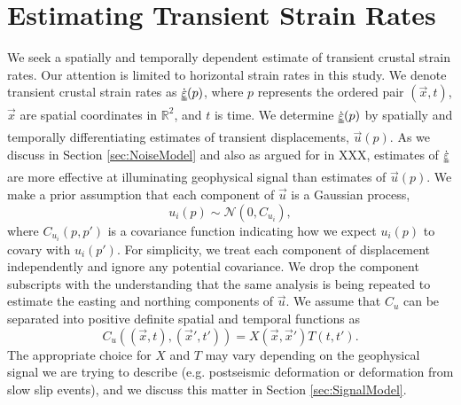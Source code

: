 \documentclass[10pt,letter]{article}
\newcommand*{\du}[1]{\uuline{#1}}
\begin{document}
\section{Estimating Transient Strain Rates}\label{sec:Method}
We seek a spatially and temporally dependent estimate of transient crustal strain rates. Our attention is limited to horizontal strain rates in this study. We denote transient crustal strain rates as $\dot{\du{\varepsilon}}(p)$, where $p$ represents the ordered pair $(\vec{x},t)$, $\vec{x}$ are spatial coordinates in $\mathbb{R}^2$, and $t$ is time. We determine $\dot{\du{\varepsilon}}(p)$ by spatially and temporally differentiating estimates of transient displacements, $\vec{u}(p)$.  As we discuss in Section \ref{sec:NoiseModel} and also as argued for in XXX, estimates of $\dot{\du{\varepsilon}}$ are more effective at illuminating geophysical signal than estimates of $\vec{u}(p)$. We make a prior assumption that each component of $\vec{u}$ is a Gaussian process,
\begin{equation}\label{eq:TransientDeformation}
u_i(p) \sim \mathcal{N}\left(0,C_{u_i}\right),
\end{equation}
where $C_{u_i}(p,p')$ is a covariance function indicating how we expect $u_i(p)$ to covary with $u_i(p')$. For simplicity, we treat each component of displacement independently and ignore any potential covariance. We drop the component subscripts with the understanding that the same analysis is being repeated to estimate the easting and northing components of $\vec{u}$. We assume that $C_u$ can be separated into positive definite spatial and temporal functions as 
\begin{equation}\label{eq:TransientCovariance}
C_{u}\left((\vec{x},t),(\vec{x}',t')\right) = X(\vec{x},\vec{x}')T(t,t').
\end{equation}  
The appropriate choice for $X$ and $T$ may vary depending on the geophysical signal we are trying to describe (e.g. postseismic deformation or deformation from slow slip events), and we discuss this matter in Section \ref{sec:SignalModel}.  
\end{document}
